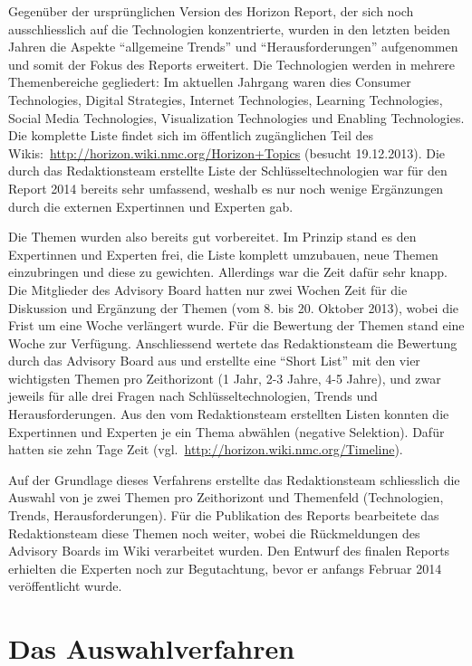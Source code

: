\documentclass[a4paper,
fontsize=11pt,
oneside,
numbers=noperiodatend,
parskip=half-,
bibliography=totoc,
final
]{scrartcl}
\begin{document}
Gegenüber der ursprünglichen Version des Horizon Report, der sich noch
ausschliesslich auf die Technologien konzentrierte, wurden in den
letzten beiden Jahren die Aspekte \enquote{allgemeine Trends} und
\enquote{Herausforderungen} aufgenommen und somit der Fokus des Reports
erweitert. Die Technologien werden in mehrere Themenbereiche gegliedert:
Im aktuellen Jahrgang waren dies Consumer Technologies, Digital
Strategies, Internet Technologies, Learning Technologies, Social Media
Technologies, Visualization Technologies und Enabling Technologies. Die
komplette Liste findet sich im öffentlich zugänglichen Teil des
Wikis:~\url{http://horizon.wiki.nmc.org/Horizon+Topics} (besucht
19.12.2013). Die durch das Redaktionsteam erstellte Liste der
Schlüsseltechnologien war für den Report 2014 bereits sehr umfassend,
weshalb es nur noch wenige Ergänzungen durch die externen Expertinnen
und Experten gab.

Die Themen wurden also bereits gut vorbereitet. Im Prinzip stand es den
Expertinnen und Experten frei, die Liste komplett umzubauen, neue Themen
einzubringen und diese zu gewichten. Allerdings war die Zeit dafür sehr
knapp. Die Mitglieder des Advisory Board hatten nur zwei Wochen Zeit für
die Diskussion und Ergänzung der Themen (vom 8. bis 20. Oktober 2013),
wobei die Frist um eine Woche verlängert wurde. Für die Bewertung der
Themen stand eine Woche zur Verfügung. Anschliessend wertete das
Redaktionsteam die Bewertung durch das Advisory Board aus und erstellte
eine \enquote{Short List} mit den vier wichtigsten Themen pro
Zeithorizont (1 Jahr, 2-3 Jahre, 4-5 Jahre), und zwar jeweils für alle
drei Fragen nach Schlüsseltechnologien, Trends und Herausforderungen.
Aus den vom Redaktionsteam erstellten Listen konnten die Expertinnen und
Experten je ein Thema abwählen (negative Selektion). Dafür hatten sie
zehn Tage Zeit (vgl.~\url{http://horizon.wiki.nmc.org/Timeline}).

Auf der Grundlage dieses Verfahrens erstellte das Redaktionsteam
schliesslich die Auswahl von je zwei Themen pro Zeithorizont und
Themenfeld (Technologien, Trends, Herausforderungen). Für die
Publikation des Reports bearbeitete das Redaktionsteam diese Themen noch
weiter, wobei die Rückmeldungen des Advisory Boards im Wiki verarbeitet
wurden. Den Entwurf des finalen Reports erhielten die Experten noch zur
Begutachtung, bevor er anfangs Februar 2014 veröffentlicht wurde.

\section*{Das Auswahlverfahren}\label{das-auswahlverfahren}
\end{document}
